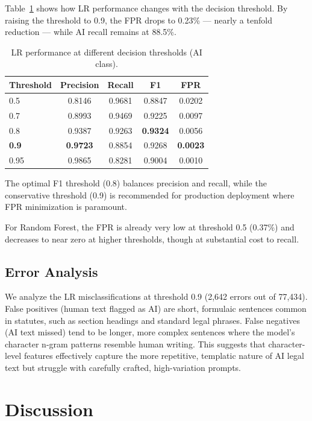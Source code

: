 \documentclass[11pt,a4paper]{article}
\begin{document}
Table~\ref{tab:thresholds} shows how LR performance changes with the decision threshold. By raising the threshold to 0.9, the FPR drops to 0.23\% --- nearly a tenfold reduction --- while AI recall remains at 88.5\%.

\begin{table}[t]
\centering
\caption{LR performance at different decision thresholds (AI class).}
\label{tab:thresholds}
\begin{tabular}{lcccc}
\toprule
Threshold & Precision & Recall & F1 & FPR \\
\midrule
0.5 & 0.8146 & 0.9681 & 0.8847 & 0.0202 \\
0.7 & 0.8993 & 0.9469 & 0.9225 & 0.0097 \\
0.8 & 0.9387 & 0.9263 & \textbf{0.9324} & 0.0056 \\
\textbf{0.9} & \textbf{0.9723} & 0.8854 & 0.9268 & \textbf{0.0023} \\
0.95 & 0.9865 & 0.8281 & 0.9004 & 0.0010 \\
\bottomrule
\end{tabular}
\end{table}

The optimal F1 threshold (0.8) balances precision and recall, while the conservative threshold (0.9) is recommended for production deployment where FPR minimization is paramount.

For Random Forest, the FPR is already very low at threshold 0.5 (0.37\%) and decreases to near zero at higher thresholds, though at substantial cost to recall.

\subsection{Error Analysis}

We analyze the LR misclassifications at threshold 0.9 (2,642 errors out of 77,434). False positives (human text flagged as AI) are short, formulaic sentences common in statutes, such as section headings and standard legal phrases. False negatives (AI text missed) tend to be longer, more complex sentences where the model's character n-gram patterns resemble human writing. This suggests that character-level features effectively capture the more repetitive, templatic nature of AI legal text but struggle with carefully crafted, high-variation prompts.

\section{Discussion}
\end{document}
